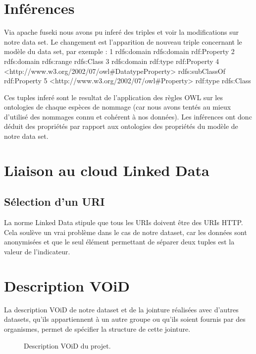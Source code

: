 \chapter{Inférences}

Via apache fuseki nous avons pu inferé des triples et voir la modifications sur notre data set. Le changement est l'apparition de nouveau triple concernant le modèle du data set, par exemple :
1	rdfs:domain rdfs:domain rdf:Property
2	rdfs:domain rdfs:range  rdfs:Class
3	rdfs:domain rdf:type    rdf:Property
4	<http://www.w3.org/2002/07/owl#DatatypeProperty>  rdfs:subClassOf rdf:Property
5	<http://www.w3.org/2002/07/owl#Property>  rdf:type  rdfs:Class

Ces tuples inferé sont le resultat de l'application des règles OWL sur les ontologies de chaque espèces de nommage (car nous avons tentés au mieux d'utilisé des nommages connu et cohérent à nos données).
Les inférences ont donc déduit des propriétés par rapport aux ontologies des propriétés du modèle de notre data set.

\chapter{Liaison au cloud Linked Data}
\section{Sélection d'un URI}

La norme Linked Data stipule que tous les URIs doivent être des URIs HTTP. Cela soulève un vrai problème dans le cas de notre dataset, car les données sont anonymisées et que le seul élément permettant de séparer deux tuples est la valeur de l'indicateur.

\chapter{Description VOiD}

La description VOiD de notre dataset et de la jointure réalisées avec d'autres datasets, qu'ils appartiennent à un autre groupe ou qu'ils soient fournis par des organismes, permet de spécifier la structure de cette jointure.

\begin{figure}[H]

\caption{Description VOiD du projet.}
\end{figure}
